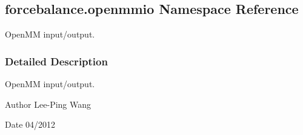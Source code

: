\hypertarget{namespaceforcebalance_1_1openmmio}{}\subsection{forcebalance.\+openmmio Namespace Reference}
\label{namespaceforcebalance_1_1openmmio}


Open\+MM input/output.  




\subsubsection{Detailed Description}
Open\+MM input/output. 

\begin{DoxyAuthor}{Author}
Lee-\/\+Ping Wang 
\end{DoxyAuthor}
\begin{DoxyDate}{Date}
04/2012 
\end{DoxyDate}
